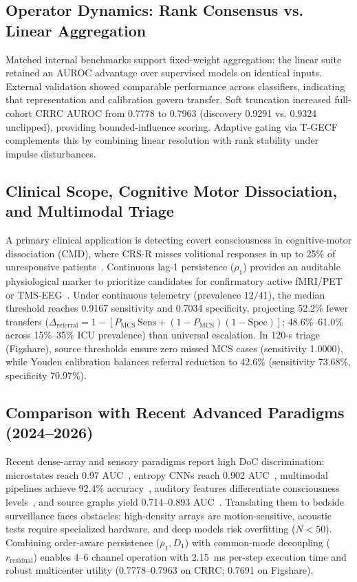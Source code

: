 \documentclass[journal,twoside,web]{ieeecolor}
\begin{document}
\vspace{-3pt}
\subsection{Operator Dynamics: Rank Consensus vs. Linear Aggregation}
Matched internal benchmarks support fixed-weight aggregation: the linear suite retained an AUROC advantage over supervised models on identical inputs. External validation showed comparable performance across classifiers, indicating that representation and calibration govern transfer. Soft truncation increased full-cohort CRRC AUROC from 0.7778 to 0.7963 (discovery 0.9291 vs. 0.9324 unclipped), providing bounded-influence scoring. Adaptive gating via T-GECF complements this by combining linear resolution with rank stability under impulse disturbances.

\vspace{-4pt}
\subsection{Clinical Scope, Cognitive Motor Dissociation, and Multimodal Triage}
A primary clinical application is detecting covert consciousness in cognitive-motor dissociation (CMD), where CRS-R misses volitional responses in up to 25\% of unresponsive patients~\cite{bodien2024cognitive}. Continuous lag-1 persistence ($\rho_1$) provides an auditable physiological marker to prioritize candidates for confirmatory active fMRI/PET or TMS-EEG~\cite{cruse2011bedside,casali2013theoretically}. Under continuous telemetry (prevalence $12/41$), the median threshold reaches 0.9167 sensitivity and 0.7034 specificity, projecting 52.2\% fewer transfers ($\Delta_{\text{referral}}=1-[P_{\text{MCS}}\,\mathrm{Sens}+(1-P_{\text{MCS}})(1-\mathrm{Spec})]$; 48.6\%--61.0\% across 15\%--35\% ICU prevalence) than universal escalation. In 120-s triage (Figshare), source thresholds ensure zero missed MCS cases (sensitivity 1.0000), while Youden calibration balances referral reduction to 42.6\% (sensitivity 73.68\%, specificity 70.97\%).

\vspace{-4pt}
\vspace{-4pt}
\subsection{Comparison with Recent Advanced Paradigms (2024--2026)}
Recent dense-array and sensory paradigms report high DoC discrimination: microstates reach 0.97 AUC~\cite{ling2024microstates}, entropy CNNs reach 0.902 AUC~\cite{qu2026diagnosis}, multimodal pipelines achieve 92.4\% accuracy~\cite{zhang2025multimodal}, auditory features differentiate consciousness levels~\cite{duan2026auditory}, and source graphs yield 0.714--0.893 AUC~\cite{hao2024uncovering}.
Translating them to bedside surveillance faces obstacles: high-density arrays are motion-sensitive, acoustic tests require specialized hardware, and deep models risk overfitting ($N < 50$). Combining order-aware persistence ($\rho_1, D_1$) with common-mode decoupling ($r_{\text{residual}}$) enables 4--6 channel operation with 2.15~ms per-step execution time and robust multicenter utility (0.7778--0.7963 on CRRC; 0.7691 on Figshare).
\end{document}
